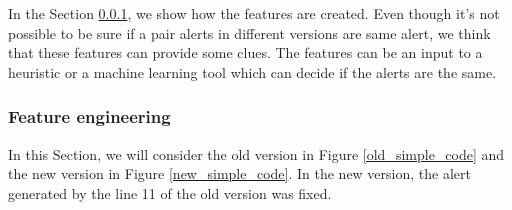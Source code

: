 \documentclass[
]{article}
\begin{document}
In the Section \ref{feature_creation}, we show how the features are
created. Even though it's not possible to be sure if a pair alerts in
different versions are same alert, we think that these features can
provide some clues. The features can be an input to a heuristic or a
machine learning tool which can decide if the alerts are the same.

\subsubsection{Feature engineering} \label{feature_creation}

In this Section, we will consider the old version in Figure
\ref{old_simple_code} and the new version in Figure
\ref{new_simple_code}. In the new version, the alert generated by the
line 11 of the old version was fixed.

\newpage

\small
\end{document}
